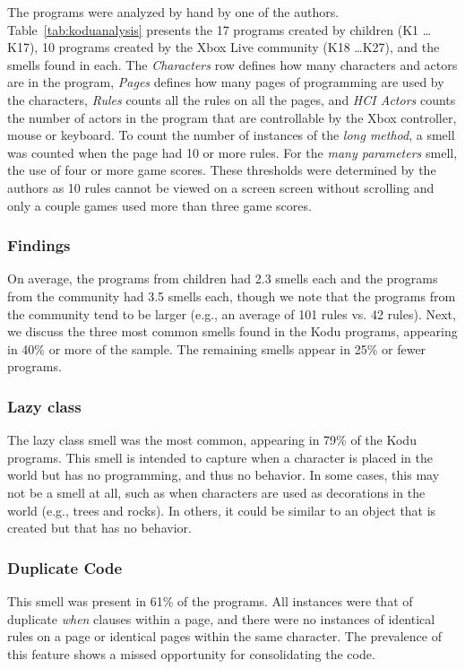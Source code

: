 \documentclass{sig-alternate}
\begin{document}
The programs were analyzed by hand by one of the authors. Table~\ref{tab:koduanalysis} presents the 17 programs created by children (K1 \dots K17), 10 programs created by the Xbox Live community (K18 \dots K27), and the smells found in each. The \emph{Characters} row defines how many characters and actors are in the program, \emph{Pages} defines how many pages of programming are used by the characters, \emph{Rules} counts all the rules on all the pages, and \emph{HCI Actors} counts the number of actors in the program that are controllable by the Xbox controller, mouse or keyboard. 
To count the number of instances of the \emph{long method}, a smell was counted when the page had 10 or more rules. For the  \emph{many parameters} smell, the use of four or more game scores. These thresholds were determined by the authors as 10 rules cannot be viewed on a screen screen without scrolling and only a couple games used more than three game scores. 

\subsubsection{Findings}
On average, the programs from children had 2.3 smells each and the programs from the community had 3.5 smells each, though we note that the programs from the community tend to be larger (e.g., an average of 101 rules vs. 42 rules). Next, we discuss the three most common smells found in the Kodu programs, appearing in 40\% or more of the sample. The remaining smells appear in 25\% or fewer programs. 

\subsubsection{Lazy class}
The lazy class smell was the most common, appearing in 79\% of the Kodu programs. This smell is intended to capture when a character is placed in the world but has no programming, and thus no behavior. In some cases, this may not be a smell at all, such as when characters are used as decorations in the world (e.g., trees and rocks). In others, it could be similar to an object that is created but that has no behavior. 

\subsubsection{Duplicate Code}
This smell was present in 61\% of the programs. All instances were that of duplicate \emph{when} clauses within a page, and there were no instances of identical rules on a page or identical pages within the same character. The prevalence of this feature shows a missed opportunity for consolidating the code. 
\end{document}
